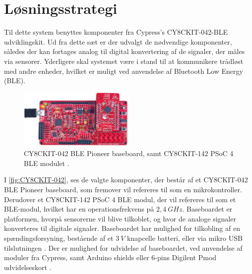 \section{Løsningsstrategi}
Til dette system benyttes komponenter fra Cypress's CY8CKIT-042-BLE udviklingskit. 
Ud fra dette sæt er der udvalgt de nødvendige komponenter, således der kan fortages analog til digital konvertering af de signaler, der måles via sensorer. Yderligere skal systemet være i stand til at kommunikere trådløst med andre enheder, hvilket er muligt ved anvendelse af Bluetooth Low Energy (BLE).


\begin{figure}[H]
\centering
\includegraphics[width=0.5\textwidth]{figures/CY8CKIT-042.png}
\caption{CY8CKIT-042 BLE Pioneer baseboard, samt CY8CKIT-142 PSoC 4 BLE modulet \citep{cypresspsoc2015}.}
\label{fig:CY8CKIT-042}
\end{figure}

\noindent
I \autoref{fig:CY8CKIT-042}, ses de valgte komponenter, der består af et CY8CKIT-042 BLE Pioneer baseboard, som fremover vil refereres til som en mikrokontroller. Derudover et CY8CKIT-142 PSoC 4 BLE modul, der vil refereres til som et BLE-modul, hvilket har en operationsfrekvens på  $2,4~GHz$. Baseboardet er platformen, hvorpå sensorerne vil blive tilkoblet, og hvor de analoge signaler konverteres til digitale signaler. Baseboardet har mulighed for tilkobling af en spændingsforsyning, bestående af et $3~V$ knapcelle batteri, eller via mikro USB tilslutningen \citep{cypressguide2014}.
Der er mulighed for udvidelse af baseboardet, ved anvendelse af moduler fra Cypress, samt Arduino shields eller 6-pins Digilent Pmod udvidelseskort \citep{cypressguide2014}. 
\\


